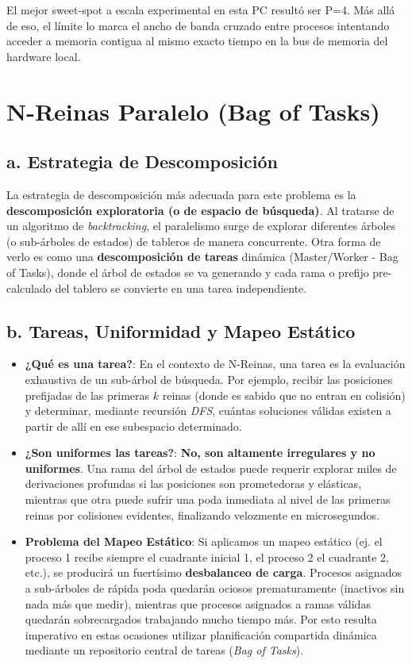 \documentclass[11pt,a4paper]{article}
\begin{document}
El mejor sweet-spot a escala experimental en esta PC resultó ser P=4. Más allá de eso, el límite lo marca el ancho de banda cruzado entre procesos intentando acceder a memoria contigua al mismo exacto tiempo en la bus de memoria del hardware local.

\section{N-Reinas Paralelo (Bag of Tasks)}

\subsection*{a. Estrategia de Descomposición}
La estrategia de descomposición más adecuada para este problema es la \textbf{descomposición exploratoria (o de espacio de búsqueda)}. Al tratarse de un algoritmo de \textit{backtracking}, el paralelismo surge de explorar diferentes árboles (o sub-árboles de estados) de tableros de manera concurrente. Otra forma de verlo es como una \textbf{descomposición de tareas} dinámica (Master/Worker - Bag of Tasks), donde el árbol de estados se va generando y cada rama o prefijo pre-calculado del tablero se convierte en una tarea independiente.

\subsection*{b. Tareas, Uniformidad y Mapeo Estático}
\begin{itemize}
    \item \textbf{¿Qué es una tarea?}: En el contexto de N-Reinas, una tarea es la evaluación exhaustiva de un sub-árbol de búsqueda. Por ejemplo, recibir las posiciones prefijadas de las primeras $k$ reinas (donde es sabido que no entran en colisión) y determinar, mediante recursión \textit{DFS}, cuántas soluciones válidas existen a partir de allí en ese subespacio determinado.
    \item \textbf{¿Son uniformes las tareas?}: \textbf{No, son altamente irregulares y no uniformes}. Una rama del árbol de estados puede requerir explorar miles de derivaciones profundas si las posiciones son prometedoras y elásticas, mientras que otra puede sufrir una poda inmediata al nivel de las primeras reinas por colisiones evidentes, finalizando velozmente en microsegundos.
    \item \textbf{Problema del Mapeo Estático}: Si aplicamos un mapeo estático (ej. el proceso 1 recibe siempre el cuadrante inicial 1, el proceso 2 el cuadrante 2, etc.), se producirá un fuertísimo \textbf{desbalanceo de carga}. Procesos asignados a sub-árboles de rápida poda quedarán ociosos prematuramente (inactivos sin nada más que medir), mientras que procesos asignados a ramas válidas quedarán sobrecargados trabajando mucho tiempo más. Por esto resulta imperativo en estas ocasiones utilizar planificación compartida dinámica mediante un repositorio central de tareas (\textit{Bag of Tasks}).
\end{itemize}
\end{document}
